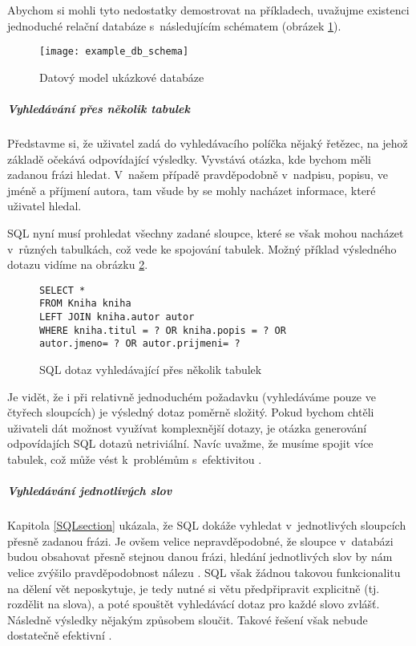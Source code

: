 \documentclass[11pt,oneside]{fithesis2}
\begin{document}
Abychom si mohli tyto nedostatky demostrovat na příkladech, uvažujme existenci jednoduché relační databáze s~následujícím schématem (obrázek \ref{example_schema}).

\begin{figure}[htbp]
	\begin{center}
		\texttt{[image: example\_db\_schema]}
	\end{center}
	\caption{Datový model ukázkové databáze}	
	\label{example_schema}
\end{figure}

\subparagraph{Vyhledávání přes několik tabulek}
Představme si, že uživatel zadá do vyhledávacího políčka nějaký řetězec, na jehož základě očekává odpovídající výsledky. Vyvstává otázka, kde bychom měli zadanou frázi hledat. V~našem případě
pravděpodobně v~nadpisu, popisu, ve jméně a příjmení autora, tam všude by se mohly nacházet informace, které uživatel hledal. 

SQL nyní musí prohledat všechny zadané sloupce, které se však mohou nacházet v~různých tabulkách, což vede ke spojování tabulek. Možný příklad výsledného dotazu vidíme na obrázku \ref{SQLexample3}.
\begin{figure}[h!]
\begin{lstlisting}[frame=single]
SELECT *
FROM Kniha kniha 
LEFT JOIN kniha.autor autor 
WHERE kniha.titul = ? OR kniha.popis = ? OR 
autor.jmeno= ? OR autor.prijmeni= ?
\end{lstlisting}
\caption{SQL dotaz vyhledávající přes několik tabulek}
\label{SQLexample3}
\end{figure}

Je vidět, že i při relativně jednoduchém požadavku (vyhledáváme pouze ve čtyřech sloupcích) je výsledný dotaz poměrně složitý. Pokud bychom chtěli uživateli dát možnost využívat komplexnější
dotazy, je otázka generování odpovídajích SQL dotazů netriviální. Navíc uvažme, že musíme spojit více tabulek, což může vést k~problémům s~efektivitou \cite[s.~9]{HibernateSearchAction}.

\subparagraph{Vyhledávání jednotlivých slov}
Kapitola \ref{SQLsection} ukázala, že SQL dokáže vyhledat v~jednotlivých sloupcích přesně zadanou frázi. Je ovšem velice nepravděpodobné, že sloupce v~databázi budou obsahovat přesně stejnou danou frázi, 
hledání jednotlivých slov by nám velice zvýšilo pravděpodobnost nálezu \cite[s.~9]{HibernateSearchAction}. SQL však žádnou takovou funkcionalitu na dělení vět neposkytuje, je tedy nutné si větu předpřipravit explicitně (tj. rozdělit na slova),
a poté spouštět vyhledávácí dotaz pro každé slovo zvlášť. Následně výsledky nějakým způsobem sloučit. Takové řešení však nebude dostatečně efektivní \cite[s.~10]{HibernateSearchAction}. 
\end{document}
